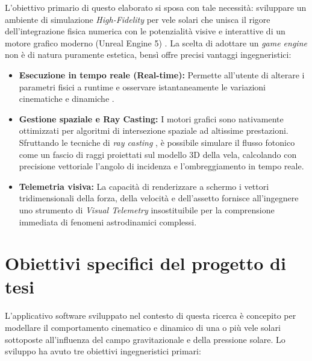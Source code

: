 L'obiettivo primario di questo elaborato si sposa con tale necessità: sviluppare un ambiente di simulazione \textit{High-Fidelity} per vele solari che unisca il rigore dell'integrazione fisica numerica con le potenzialità visive e interattive di un motore grafico moderno (Unreal Engine 5) \cite{epicgames_unrealengine}. 
La scelta di adottare un \textit{game engine} non è di natura puramente estetica, bensì offre precisi vantaggi ingegneristici:
\begin{itemize}
    \item \textbf{Esecuzione in tempo reale (Real-time):} Permette all'utente di alterare i parametri fisici a runtime e osservare istantaneamente le variazioni cinematiche e dinamiche \cite{acton2014data}.
    \item \textbf{Gestione spaziale e Ray Casting:} I motori grafici sono nativamente ottimizzati per algoritmi di intersezione spaziale ad altissime prestazioni. Sfruttando le tecniche di \textit{ray casting} \cite{ericson2004real}, è possibile simulare il flusso fotonico come un fascio di raggi proiettati sul modello 3D della vela, calcolando con precisione vettoriale l'angolo di incidenza e l'ombreggiamento in tempo reale.
    \item \textbf{Telemetria visiva:} La capacità di renderizzare a schermo i vettori tridimensionali della forza, della velocità e dell'assetto fornisce all'ingegnere uno strumento di \textit{Visual Telemetry} insostituibile per la comprensione immediata di fenomeni astrodinamici complessi.
\end{itemize}


\section*{Obiettivi specifici del progetto di tesi}

L'applicativo software sviluppato nel contesto di questa ricerca è concepito per modellare il comportamento cinematico e dinamico di una o più vele solari sottoposte all'influenza del campo gravitazionale e della pressione solare. Lo sviluppo ha avuto tre obiettivi ingegneristici primari:

